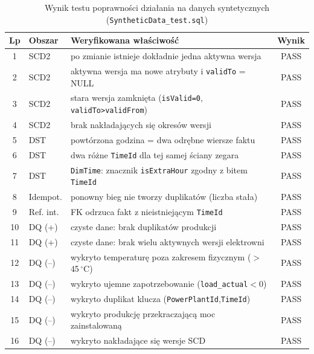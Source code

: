 \documentclass[12pt]{article}
\begin{document}
	\begin{table}[H]
		\centering
		\small
		\begin{tabularx}{\textwidth}{|c|p{2.0cm}|X|c|}
			\hline
			\textbf{Lp} & \textbf{Obszar} & \textbf{Weryfikowana właściwość} & \textbf{Wynik} \\
			\hline
			1  & SCD2   & po zmianie istnieje dokładnie jedna aktywna wersja & PASS \\ \hline
			2  & SCD2   & aktywna wersja ma nowe atrybuty i \texttt{validTo} = NULL & PASS \\ \hline
			3  & SCD2   & stara wersja zamknięta (\texttt{isValid=0}, \texttt{validTo>validFrom}) & PASS \\ \hline
			4  & SCD2   & brak nakładających się okresów wersji & PASS \\ \hline
			5  & DST    & powtórzona godzina = dwa odrębne wiersze faktu & PASS \\ \hline
			6  & DST    & dwa różne \texttt{TimeId} dla tej samej ściany zegara & PASS \\ \hline
			7  & DST    & \texttt{DimTime}: znacznik \texttt{isExtraHour} zgodny z bitem \texttt{TimeId} & PASS \\ \hline
			8  & Idempot. & ponowny bieg nie tworzy duplikatów (liczba stała) & PASS \\ \hline
			9  & Ref. int. & FK odrzuca fakt z nieistniejącym \texttt{TimeId} & PASS \\ \hline
			10 & DQ (+) & czyste dane: brak duplikatów produkcji & PASS \\ \hline
			11 & DQ (+) & czyste dane: brak wielu aktywnych wersji elektrowni & PASS \\ \hline
			12 & DQ (--) & wykryto temperaturę poza zakresem fizycznym ($>$45\,$^\circ$C) & PASS \\ \hline
			13 & DQ (--) & wykryto ujemne zapotrzebowanie (\texttt{load\_actual}$<$0) & PASS \\ \hline
			14 & DQ (--) & wykryto duplikat klucza (\texttt{PowerPlantId},\texttt{TimeId}) & PASS \\ \hline
			15 & DQ (--) & wykryto produkcję przekraczającą moc zainstalowaną & PASS \\ \hline
			16 & DQ (--) & wykryto nakładające się wersje SCD & PASS \\ \hline
		\end{tabularx}
		\caption{Wynik testu poprawności działania na danych syntetycznych (\texttt{SyntheticData\_test.sql})}
		\label{tab:synttest}
	\end{table}
\end{document}
